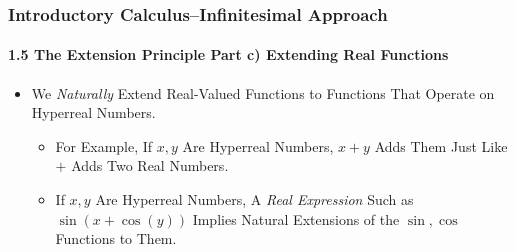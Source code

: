 \begin{frame}
\frametitle{Introductory Calculus--Infinitesimal Approach}
\framesubtitle{1.5 The Extension Principle Part c) Extending Real Functions}
\label{slide:1.5-08}
\begin{itemize}
\item We \alert{\textit{Naturally} Extend Real-Valued Functions to Functions That Operate on Hyperreal Numbers}.
\begin{itemize}
\pause\item For Example, \alert{If $x,y$ Are Hyperreal Numbers, $x+y$ Adds Them Just Like $+$ Adds Two Real Numbers}.
\pause\item \alert{If $x,y$ Are Hyperreal Numbers, A \textit{Real Expression} Such as $\sin(x+\cos(y))$ Implies Natural Extensions of the $\sin,\cos$ Functions to Them}.
\end{itemize}
\end{itemize}
\end{frame}
